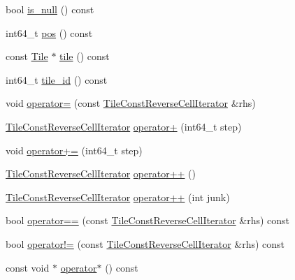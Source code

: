\begin{DoxyCompactItemize}
\item 
bool \hyperlink{classTileConstReverseCellIterator_a3947d453755c0ab57e6dc983c017c853}{is\+\_\+null} () const 
\item 
int64\+\_\+t \hyperlink{classTileConstReverseCellIterator_a59f320057ccf833327c07cf193664199}{pos} () const 
\item 
const \hyperlink{classTile}{Tile} $\ast$ \hyperlink{classTileConstReverseCellIterator_a4431d46c5df508fb1bf4b3b3bea740b5}{tile} () const 
\item 
int64\+\_\+t \hyperlink{classTileConstReverseCellIterator_ace95cc51ca8c63aae6a772b97cbafa0b}{tile\+\_\+id} () const 
\item 
void \hyperlink{classTileConstReverseCellIterator_ae5b14604cc91c8545a5cd7654371cdcf}{operator=} (const \hyperlink{classTileConstReverseCellIterator}{Tile\+Const\+Reverse\+Cell\+Iterator} \&rhs)
\item 
\hyperlink{classTileConstReverseCellIterator}{Tile\+Const\+Reverse\+Cell\+Iterator} \hyperlink{classTileConstReverseCellIterator_ac91da46e1fbb890dbfd9c3e60f3ec4fb}{operator+} (int64\+\_\+t step)
\item 
void \hyperlink{classTileConstReverseCellIterator_a19066663fed142c655080de2456d62eb}{operator+=} (int64\+\_\+t step)
\item 
\hyperlink{classTileConstReverseCellIterator}{Tile\+Const\+Reverse\+Cell\+Iterator} \hyperlink{classTileConstReverseCellIterator_a54d250046661d3b2af52b4fae2d7578c}{operator++} ()
\item 
\hyperlink{classTileConstReverseCellIterator}{Tile\+Const\+Reverse\+Cell\+Iterator} \hyperlink{classTileConstReverseCellIterator_ac70f708a7707674ac0be07e43c902b3e}{operator++} (int junk)
\item 
bool \hyperlink{classTileConstReverseCellIterator_a745c6de5a34df7dfb7c1293fd30fbee5}{operator==} (const \hyperlink{classTileConstReverseCellIterator}{Tile\+Const\+Reverse\+Cell\+Iterator} \&rhs) const 
\item 
bool \hyperlink{classTileConstReverseCellIterator_aad68a3b03bc04ae746b11ce9e6fdd10a}{operator!=} (const \hyperlink{classTileConstReverseCellIterator}{Tile\+Const\+Reverse\+Cell\+Iterator} \&rhs) const 
\item 
const void $\ast$ \hyperlink{classTileConstReverseCellIterator_a3e1e1fc096acc99f85acf887a7bf7c84}{operator$\ast$} () const 
\end{DoxyCompactItemize}
